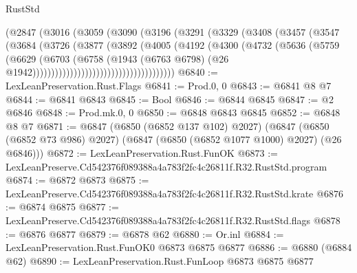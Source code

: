 \begin{lexlean}{RustStd}
\begin{coremodule}
                              (@2847
                                (@3016
                                  (@3059
                                    (@3090
                                      (@3196
                                        (@3291
                                          (@3329
                                            (@3408
                                              (@3457
                                                (@3547
                                                  (@3684
                                                    (@3726
                                                      (@3877
                                                        (@3892
                                                          (@4005
                                                            (@4192
                                                              (@4300
                                                                (@4732
                                                                  (@5636
                                                                    (@5759
                                                                      (@6629
                                                                        (@6703
                                                                          (@6758
                                                                            (@1943
                                                                              (@6763 @6798)
                                                                              (@26
                                                                                @1942))))))))))))))))))))))))))))))))))))))
@6840 := LexLeanPreservation.Rust.Flags
@6841 := Prod.{0, 0}
@6843 := @6841 @8 @7
@6844 := @6841 @6843
@6845 := Bool
@6846 := @6844 @6845
@6847 := @2 @6846
@6848 := Prod.mk.{0, 0}
@6850 := @6848 @6843 @6845
@6852 := @6848 @8 @7
@6871 := @6847
    (@6850 (@6852 @137 @102) @2027)
    (@6847 (@6850 (@6852 @73 @986) @2027) (@6847 (@6850 (@6852 @1077 @1000) @2027) (@26 @6846)))
@6872 := LexLeanPreservation.Rust.FunOK
@6873 := LexLeanPreserve.Cd542376f089388a4a783f2fc4c26811f.R32.RustStd.program
@6874 := @6872 @6873
@6875 := LexLeanPreserve.Cd542376f089388a4a783f2fc4c26811f.R32.RustStd.krate
@6876 := @6874 @6875
@6877 := LexLeanPreserve.Cd542376f089388a4a783f2fc4c26811f.R32.RustStd.flags
@6878 := @6876 @6877
@6879 := @6878 @62
@6880 := Or.inl
@6884 := LexLeanPreservation.Rust.FunOK0 @6873 @6875 @6877
@6886 := @6880 (@6884 @62)
@6890 := LexLeanPreservation.Rust.FunLoop @6873 @6875 @6877

\end{coremodule}
\end{lexlean}
